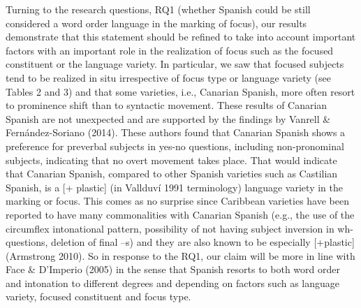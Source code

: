 \documentclass[11pt]{article}
\newenvironment{styleStandard}{\setlength\leftskip{0cm}\setlength\rightskip{0cm plus 1fil}\setlength\parindent{0cm}\setlength\parfillskip{0pt plus 1fil}\setlength\parskip{0in plus 1pt}\writerlistparindent\writerlistleftskip\leavevmode\normalfont\normalsize\writerlistlabel\ignorespaces}{\unskip\vspace{0.139in plus 0.0139in}\par}
\newcommand\writerlistleftskip{}
\newcommand\writerlistparindent{}
\newcommand\writerlistlabel{}
\begin{document}
\begin{styleStandard}
Turning to the research questions, RQ1 (whether Spanish could be still considered a word order language in the marking of focus), our results demonstrate that this statement should be refined to take into account important factors with an important role in the realization of focus such as the focused constituent or the language variety. In particular, we saw that focused subjects tend to be realized in situ irrespective of focus type or language variety (see Tables 2 and 3) and that some varieties, i.e., Canarian Spanish, more often resort to prominence shift than to syntactic movement. These results of Canarian Spanish are not unexpected and are supported by the findings by Vanrell \& Fernández-Soriano (2014). These authors found that Canarian Spanish shows a preference for preverbal subjects in yes-no questions, including non-pronominal subjects, indicating that no overt movement takes place. That would indicate that Canarian Spanish, compared to other Spanish varieties such as Castilian Spanish, is a [+ plastic] (in Vallduví 1991 terminology) language variety in the marking or focus. This comes as no surprise since Caribbean varieties have been reported to have many commonalities with Canarian Spanish (e.g., the use of the circumflex intonational pattern, possibility of not having subject inversion in wh-questions, deletion of final –s) and they are also known to be especially [+plastic] (Armstrong 2010). So in response to the RQ1, our claim will be more in line with Face \& D’Imperio (2005) in the sense that Spanish resorts to both word order and intonation to different degrees and depending on factors such as language variety, focused constituent and focus type.
\end{styleStandard}
\end{document}
